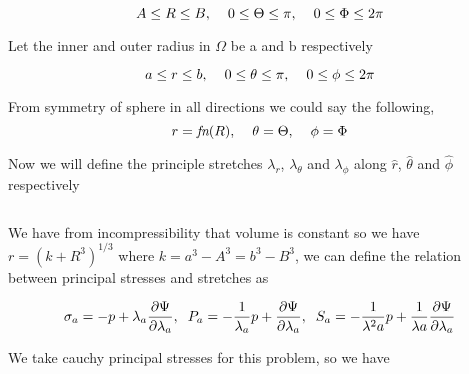 \documentclass[12pt]{report}
\begin{document}
\[A\leq R \leq B,\hspace{4mm}0\leq \Theta \leq \pi,\hspace{4mm} 0\leq \Phi \leq 2\pi \]
\begin{flushleft}
Let the inner and outer radius in $\Omega$ be a and b respectively

\[a\leq r \leq b,\hspace{4mm}0\leq \theta \leq \pi,\hspace{4mm} 0\leq \phi \leq 2\pi \]

From symmetry of sphere in all directions we could say the following,
\[ r = \textit{fn}(R),\hspace{4mm}\theta=\Theta,\hspace{4mm}\phi=\Phi  \]

\pagebreak

Now we will define the principle stretches $\lambda_{r}$, $\lambda_{\theta}$ and $\lambda_{\phi}$ along $\hat{r}$, $\hat{\theta}$ and $\hat{\phi}$ respectively 

\begin{equation}\label{eq:1.5}
 \end{equation}
 
We have from incompressibility that volume is constant so we have $r = (k + R^{3})^{1/3}$ where $k = a^{3}-A^{3} = b^{3}-B^{3} $, we can define the relation between principal stresses and stretches as

\begin{equation}\label{eq1.6}
    \sigma_{a} = -p + \lambda_{a}\frac{\partial\Psi}{\partial\lambda_{a}},\hspace{2mm}P_{a} = -\frac{1}{\lambda_{a}}p + \frac{\partial\Psi}{\partial\lambda_{a}},\hspace{2mm}S_{a} = -\frac{1}{\lambda^{2}{a}}p + \frac{1}{\lambda{a}}\frac{\partial\Psi}{\partial\lambda_{a}}
\end{equation}

We take cauchy principal stresses for this problem, so we have


\end{flushleft}
\end{document}
